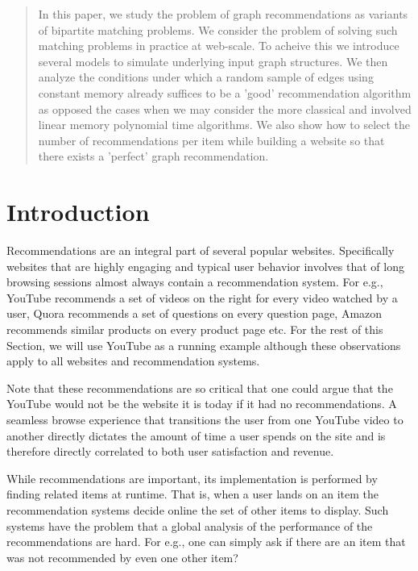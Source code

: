 \begin{abstract}

In this paper, we study the problem of graph recommendations as 
variants of bipartite matching problems. We consider the problem
of solving such matching problems in practice at web-scale. To acheive
this we introduce several models to simulate underlying input graph
structures. We then analyze the conditions under which a random sample 
of edges using constant memory already suffices to be a 
'good' recommendation algorithm as opposed the cases when we may consider
the more classical and involved linear memory polynomial time algorithms. 
We also show how to select the number of recommendations per item while 
building a website so that there exists a 'perfect' graph recommendation.

\end{abstract}

\section{Introduction}

Recommendations are an integral part of several popular websites. Specifically
websites that are highly engaging and typical user behavior involves that
of long browsing sessions almost always contain a recommendation system. For 
e.g., YouTube recommends a set of videos on the right for every video watched
by a user, Quora recommends a set of questions on every question page, Amazon 
recommends similar products on every product page etc. For the rest of this Section,
we will use YouTube as a running example although these observations apply to 
all websites and recommendation systems.

Note that these recommendations are so critical that one could argue that the YouTube
would not be the website it is today if it had no recommendations. A seamless
browse experience that transitions the user from one YouTube video to another directly
dictates the amount of time a user spends on the site and is therefore directly correlated
to both user satisfaction and revenue. 

While recommendations are important, its implementation is performed by finding related
items at runtime. That is, when a user lands on an item the recommendation systems
decide online the set of other items to display. Such systems have the problem that
a global analysis of the performance of the recommendations are hard. For e.g., one
can simply ask if there are an item that was not recommended by even one other item? 

